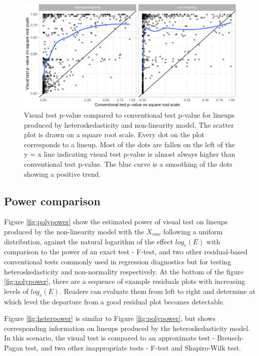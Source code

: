 \documentclass[]{interact}
\theoremstyle{plain}%
\theoremstyle{definition}
\theoremstyle{remark}
\begin{document}
\begin{figure}

{\centering \includegraphics[width=1\linewidth]{paper_comparison_files/figure-latex/p-value-comparison-1} 

}

\caption{Visual test p-value compared to conventional test p-value for lineups produced by heteroskedasticity and non-linearity model. The scatter plot is drawn on a square root scale. Every dot on the plot corresponds to a lineup. Most of the dots are fallen on the left of the y = x line indicating visual test p-value is almost always higher than conventional test p-value. The blue curve is a smoothing of the dots showing a positive trend. }\label{fig:p-value-comparison}
\end{figure}

\hypertarget{power-comparison}{%
\subsection{Power comparison}\label{power-comparison}}

Figure \ref{fig:polypower} show the estimated power of visual test on
lineups produced by the non-linearity model with the \(X_{raw}\)
following a uniform distribution, against the natural logarithm of the
effect \(log_e(E)\) with comparison to the power of an exact test -
F-test, and two other residual-based conventional tests commonly used in
regression diagnostics but for testing heteroskedasticity and
non-normality respectively. At the bottom of the figure
\ref{fig:polypower}, there are a sequence of example residuals plots
with increasing levels of \(log_e(E)\). Readers can evaluate them from
left to right and determine at which level the departure from a good
residual plot becomes detectable.

Figure \ref{fig:heterpower} is similar to Figure \ref{fig:polypower},
but shows corresponding information on lineups produced by the
heteroskedasticity model. In this scenario, the visual test is compared
to an approximate test - Breusch-Pagan test, and two other inappropriate
tests - F-test and Shapiro-Wilk test.
\end{document}
